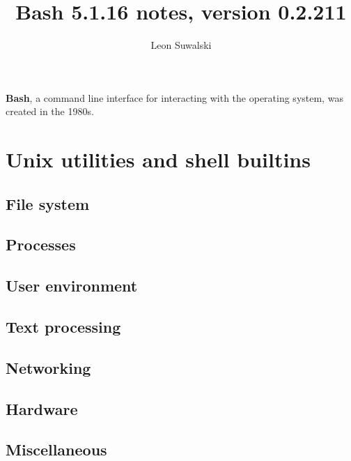 \documentclass{charun}
\title{Bash 5.1.16 notes, version 0.2.211}
\author{Leon Suwalski}
\begin{document}
\begin{multicols*}{3}
\maketitle
\raggedright

\textbf{Bash}, a command line interface for interacting with the operating system, was created in the 1980s.










\newpage
\section{Unix utilities and shell builtins}
\subsection{File system}


\subsection{Processes}


\subsection{User environment}


\subsection{Text processing}


\subsection{Networking}


\subsection{Hardware}


\subsection{Miscellaneous}


\end{multicols*}
\end{document}

